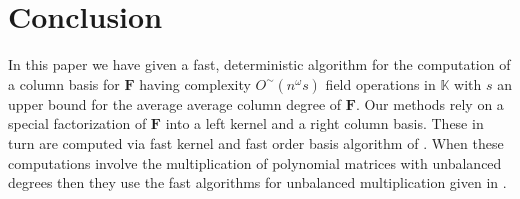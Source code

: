 
\section{Conclusion}

In this paper we have given a fast, deterministic algorithm for the
computation of a column basis for $\mathbf{F}$ having complexity
$O^{\sim}\left(n^{\omega}s\right)$ field operations in $\mathbb{K}$
with $s$ an upper bound for the average average column degree of
$\mathbf{F}$. Our methods rely on a special factorization of $\mathbf{F}$
into a left kernel and a right column basis. These in turn are computed
via fast kernel and fast order basis algorithm of \cite{za2012,ZL2012}.
When these computations involve the multiplication of polynomial matrices
with unbalanced degrees then they use the fast algorithms for unbalanced
multiplication given in \cite{za2012}.


